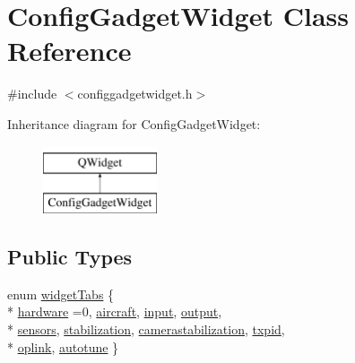 \hypertarget{class_config_gadget_widget}{\section{Config\-Gadget\-Widget Class Reference}
\label{class_config_gadget_widget}
}


{\ttfamily \#include $<$configgadgetwidget.\-h$>$}

Inheritance diagram for Config\-Gadget\-Widget\-:\begin{figure}[H]
\begin{center}
\leavevmode
\includegraphics[height=2.000000cm]{class_config_gadget_widget}
\end{center}
\end{figure}
\subsection*{Public Types}
\begin{DoxyCompactItemize}
\item 
enum \hyperlink{group___config_plugin_ga63fe84e8399ffe3db8ffa9c83b109c66}{widget\-Tabs} \{ \\*
\hyperlink{group___config_plugin_gga63fe84e8399ffe3db8ffa9c83b109c66a5d6b5e9de62beaabf98d3f3d4898bd37}{hardware} =0, 
\hyperlink{group___config_plugin_gga63fe84e8399ffe3db8ffa9c83b109c66a0daadf1249382ad3b13cd539bcafc8a5}{aircraft}, 
\hyperlink{group___config_plugin_gga63fe84e8399ffe3db8ffa9c83b109c66a0c4c2ed85d2c3d9acd90fbd2392f10aa}{input}, 
\hyperlink{group___config_plugin_gga63fe84e8399ffe3db8ffa9c83b109c66ab940a2bf8cfb52030d1b1d7c0cddb5b2}{output}, 
\\*
\hyperlink{group___config_plugin_gga63fe84e8399ffe3db8ffa9c83b109c66a9f0c06e93c63493f41060eb823cc2448}{sensors}, 
\hyperlink{group___config_plugin_gga63fe84e8399ffe3db8ffa9c83b109c66a4544ce691818bcec4988f0a3e5055b40}{stabilization}, 
\hyperlink{group___config_plugin_gga63fe84e8399ffe3db8ffa9c83b109c66afb489ec55c65ac005cbe0319bab20e11}{camerastabilization}, 
\hyperlink{group___config_plugin_gga63fe84e8399ffe3db8ffa9c83b109c66a0926ebfc1e048a25fbe8816714dcb0c8}{txpid}, 
\\*
\hyperlink{group___config_plugin_gga63fe84e8399ffe3db8ffa9c83b109c66a316bc45a7cc6c902ea6b24978bb7648f}{oplink}, 
\hyperlink{group___config_plugin_gga63fe84e8399ffe3db8ffa9c83b109c66a446519617d79946d8c73fedbaf8b4e60}{autotune}
 \}
\end{DoxyCompactItemize}

